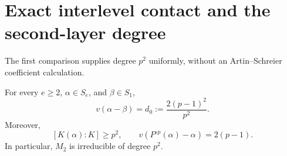 \section{Exact interlevel contact and the second-layer degree}\label{sec:second}

The first comparison supplies degree \(p^2\) uniformly, without
an Artin--Schreier coefficient calculation.

\begin{proposition}\label{prop:second}
For every \(e\ge2\), \(\alpha\in S_e\), and \(\beta\in S_1\),
\begin{equation}\label{eq:exact-contact}
 v(\alpha-\beta)=d_0:=\frac{2(p-1)^2}{p^2}.
\end{equation}
Moreover,
\begin{equation}\label{eq:pstep}
 [K(\alpha):K]\ge p^2,\qquad
 v(P^{\circ p}(\alpha)-\alpha)=2(p-1).
\end{equation}
In particular, \(M_2\) is irreducible of degree \(p^2\).
\end{proposition}

